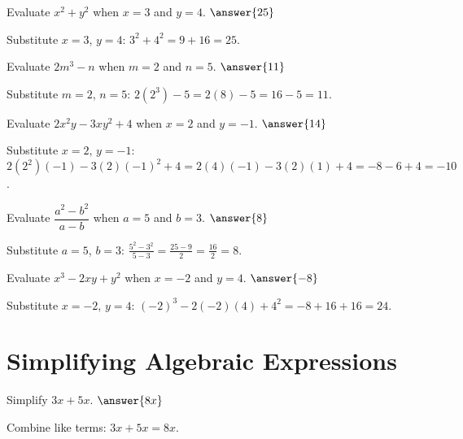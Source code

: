 \documentclass{ximera}
\begin{document}
\begin{problem}
Evaluate $x^2 + y^2$ when $x = 3$ and $y = 4$. $\answer{25}$
\begin{feedback}
Substitute $x = 3$, $y = 4$: $3^2 + 4^2 = 9 + 16 = 25$.
\end{feedback}
\end{problem}

\begin{problem}
Evaluate $2m^3 - n$ when $m = 2$ and $n = 5$. $\answer{11}$
\begin{feedback}
Substitute $m = 2$, $n = 5$: $2(2^3) - 5 = 2(8) - 5 = 16 - 5 = 11$.
\end{feedback}
\end{problem}


\begin{problem}
Evaluate $2x^2y - 3xy^2 + 4$ when $x = 2$ and $y = -1$. $\answer{14}$
\begin{feedback}
Substitute $x = 2$, $y = -1$: $2(2^2)(-1) - 3(2)(-1)^2 + 4 = 2(4)(-1) - 3(2)(1) + 4 = -8 - 6 + 4 = -10$.
\end{feedback}
\end{problem}

\begin{problem}
Evaluate $\dfrac{a^2 - b^2}{a - b}$ when $a = 5$ and $b = 3$. $\answer{8}$
\begin{feedback}
Substitute $a = 5$, $b = 3$: $\frac{5^2 - 3^2}{5 - 3} = \frac{25 - 9}{2} = \frac{16}{2} = 8$.
\end{feedback}
\end{problem}

\begin{problem}
Evaluate $x^3 - 2xy + y^2$ when $x = -2$ and $y = 4$. $\answer{-8}$
\begin{feedback}
Substitute $x = -2$, $y = 4$: $(-2)^3 - 2(-2)(4) + 4^2 = -8 + 16 + 16 = 24$.
\end{feedback}
\end{problem}



\section*{Simplifying Algebraic Expressions}

\begin{problem}
Simplify $3x + 5x$. $\answer{8x}$
\begin{feedback}
Combine like terms: $3x + 5x = 8x$.
\end{feedback}
\end{problem}
\end{document}

